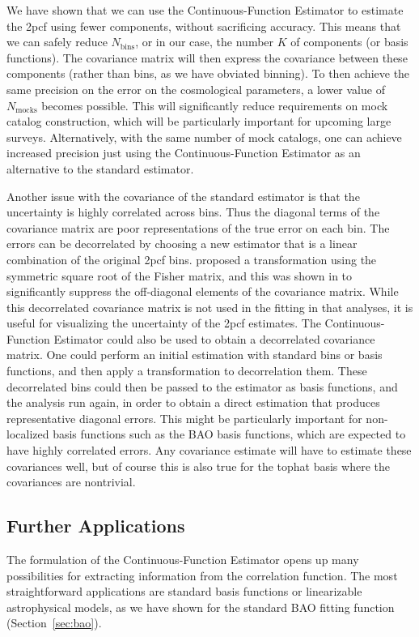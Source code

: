 \documentclass[modern]{aastex62}
\newcommand{\cf}{2pcf\xspace}
\newcommand{\Est}{The Continuous-Function Estimator\xspace}
\newcommand{\est}{the Continuous-Function Estimator\xspace}
\newcommand{\NN}[1]{N_\mathrm{#1}}
\begin{document}
We have shown that we can use \est to estimate the \cf using fewer components, without sacrificing accuracy.
This means that we can safely reduce $\NN{bins}$, or in our case, the number $K$ of components (or basis functions).
The covariance matrix will then express the covariance between these components (rather than bins, as we have obviated binning).
To then achieve the same precision on the error on the cosmological parameters, a lower value of $\NN{mocks}$ becomes possible.
This will significantly reduce requirements on mock catalog construction, which will be particularly important for upcoming large surveys. 
Alternatively, with the same number of mock catalogs, one can achieve increased precision just using \est as an alternative to the standard estimator.

Another issue with the covariance of the standard estimator is that the uncertainty is highly correlated across bins.
Thus the diagonal terms of the covariance matrix are poor representations of the true error on each bin.
The errors can be decorrelated by choosing a new estimator that is a linear combination of the original \cf bins. 
\cite{Hamilton2000} proposed a transformation using the symmetric square root of the Fisher matrix, and this was shown in \cite{Anderson2014} to significantly suppress the off-diagonal elements of the covariance matrix.
While this decorrelated covariance matrix is not used in the fitting in that analyses, it is useful for visualizing the uncertainty of the \cf estimates.
\Est could also be used to obtain a decorrelated covariance matrix.
One could perform an initial estimation with standard bins or basis functions, and then apply a transformation to decorrelation them.
These decorrelated bins could then be passed to the estimator as basis functions, and the analysis run again, in order to obtain a direct estimation that produces representative diagonal errors.
This might be particularly important for non-localized basis functions such as the BAO basis functions, which are expected to have highly correlated errors.
Any covariance estimate will have to estimate these covariances well, but of course this is also true for the tophat basis where the covariances are nontrivial.

\subsection{Further Applications}
\label{sec:applications}

The formulation of \est opens up many possibilities for extracting information from the correlation function.
The most straightforward applications are standard basis functions or linearizable astrophysical models, as we have shown for the standard BAO fitting function (Section~\ref{sec:bao}).
\end{document}
